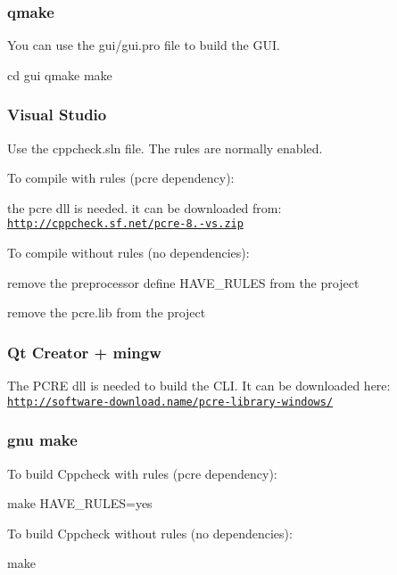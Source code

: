 \subsubsection*{qmake}

You can use the gui/gui.\-pro file to build the G\-U\-I. \begin{DoxyVerb}cd gui
qmake
make
\end{DoxyVerb}


\subsubsection*{Visual Studio}

Use the cppcheck.\-sln file. The rules are normally enabled.

To compile with rules (pcre dependency)\-:
\begin{DoxyItemize}
\item the pcre dll is needed. it can be downloaded from\-: \href{http://cppcheck.sf.net/pcre-8.10-vs.zip}{\tt http\-://cppcheck.\-sf.\-net/pcre-\/8.-\/vs.\-zip}
\end{DoxyItemize}

To compile without rules (no dependencies)\-:
\begin{DoxyItemize}
\item remove the preprocessor define H\-A\-V\-E\-\_\-\-R\-U\-L\-E\-S from the project
\item remove the pcre.\-lib from the project
\end{DoxyItemize}

\subsubsection*{Qt Creator + mingw}

The P\-C\-R\-E dll is needed to build the C\-L\-I. It can be downloaded here\-: \href{http://software-download.name/pcre-library-windows/}{\tt http\-://software-\/download.\-name/pcre-\/library-\/windows/}

\subsubsection*{gnu make}

To build Cppcheck with rules (pcre dependency)\-: \begin{DoxyVerb}make HAVE_RULES=yes
\end{DoxyVerb}


To build Cppcheck without rules (no dependencies)\-: \begin{DoxyVerb}make
\end{DoxyVerb}



